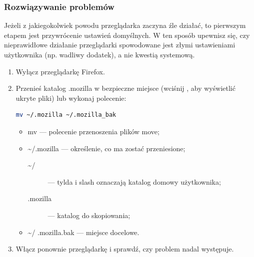 \subsubsection{Rozwiązywanie problemów}
Jeżeli z jakiegokolwiek powodu przeglądarka zaczyna źle działać, to pierwszym etapem jest przywrócenie ustawień domyślnych. W ten sposób upewnisz się, czy nieprawidłowe działanie przeglądarki spowodowane jest złymi ustawieniami użytkownika (np. wadliwy dodatek), a nie kwestią systemową.
\begin{enumerate}
\item Wyłącz przeglądarkę Firefox.
\item Przenieś katalog .mozilla w bezpieczne miejsce (wciśnij , aby wyświetlić ukryte pliki) lub wykonaj polecenie:
\begin{lstlisting}[language=bash]
mv ~/.mozilla ~/.mozilla_bak
\end{lstlisting}
\begin{itemize}
\item \textcolor{ubuntu_orange}{mv} --- polecenie przenoszenia plików move;
\item \textcolor{ubuntu_orange}{\textasciitilde /.mozilla} --- określenie, co ma zostać przeniesione;
	\begin{description}
	\item[\textasciitilde /] --- tylda i slash oznaczają katalog domowy użytkownika;
	\item[.mozilla] --- katalog do skopiowania;
	\end{description}
\item \textasciitilde / .mozilla.bak --- miejsce docelowe.
\end{itemize}
\item Włącz ponownie przeglądarkę i sprawdź, czy problem nadal występuje.
\end{enumerate}
